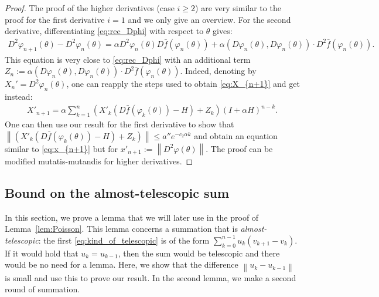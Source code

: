 \documentclass{article}
\newcommand\norm[1]{\left\|#1\right\|}
\begin{document}
\begin{proof}
    The proof of the higher derivatives (case $i\ge2$) are very similar to the proof for the first derivative $i=1$ and we only give an overview. For the second derivative, differentiating \eqref{eq:rec_Dphi} with respect to $\theta$ gives:
    \begin{align*}
        D^2 \varphi_{n+1}(\theta) - D^2 \varphi_{n}(\theta) = \alpha D^2\varphi_n(\theta) D \bar{f} (\varphi_n(\theta)) + \alpha (D \varphi_n(\theta),D\varphi_n(\theta))\cdot D^2 \bar{f} (\varphi_n(\theta)).
    \end{align*}
    This equation is very close to \eqref{eq:rec_Dphi} with an additional term $Z_n :=\alpha (D \varphi_n(\theta),D\varphi_n(\theta))\cdot D^2 \bar{f} (\varphi_n(\theta))$. Indeed, denoting by $X_{n}'=D^2 \varphi_{n}(\theta)$, one can reapply the steps used to obtain \eqref{eq:X_{n+1}} and get instead:
    \begin{align*}
        X'_{n+1} = \alpha \sum_{k=1}^n  (X'_k (D\bar{f}(\varphi_k(\theta)) - H)+Z_k)(I+\alpha H)^{n-k}.
    \end{align*}
    One can then use our result for the first derivative to show that $\norm{(X'_k (D\bar{f}(\varphi_k(\theta)) - H)+Z_k)}\le a'' e^{-c_2\alpha k}$ and obtain an equation similar to \eqref{eq:x_{n+1}} but for $x'_{n+1}:=\norm{D^2\varphi(\theta)}$. The proof can be modified mutatis-mutandis for higher derivatives. 
\end{proof}


\subsection{Bound on the almost-telescopic sum} In this section, we prove a lemma that we will later use in the proof of Lemma~\ref{lem:Poisson}. This lemma concerns a summation that is \emph{almost-telescopic}: the first \eqref{eq:kind_of_telescopic} is of the form $\sum_{k=0}^{n-1} u_k(v_{k+1}-v_{k})$. If it would hold that $u_k=u_{k-1}$, then the sum would be telescopic and there would be no need for a lemma. Here, we show that the difference $\norm{u_k-u_{k-1}}$ is small and use this to prove our result. In the second lemma, we make a second round of summation.
\end{document}
